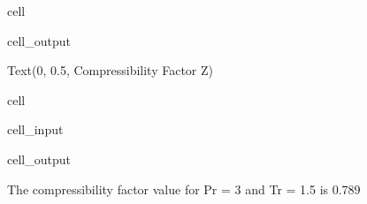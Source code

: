 \documentclass[letterpaper,10pt,english]{jupyterBook}
\begin{document}
\begin{sphinxuseclass}{cell}
\begin{sphinxVerbatimOutput}
\begin{sphinxuseclass}{cell_output}
\begin{sphinxVerbatim}[commandchars=\\\{\}]
Text(0, 0.5, \PYGZsq{}Compressibility Factor Z\PYGZsq{})
\end{sphinxVerbatim}

\noindent{}

\end{sphinxuseclass}\end{sphinxVerbatimOutput}

\end{sphinxuseclass}
\begin{sphinxuseclass}{cell}\begin{sphinxVerbatimInput}

\begin{sphinxuseclass}{cell_input}
\begin{sphinxVerbatim}[commandchars=\\\{\}]
  

  
  
  \PYG{p}{[}\PYG{p}{]}
    
\end{sphinxVerbatim}

\end{sphinxuseclass}\end{sphinxVerbatimInput}
\begin{sphinxVerbatimOutput}

\begin{sphinxuseclass}{cell_output}
\begin{sphinxVerbatim}[commandchars=\\\{\}]
The compressibility factor value for P\PYGZus{}r = 3 and T\PYGZus{}r = 1.5 is 0.789
\end{sphinxVerbatim}

\end{sphinxuseclass}\end{sphinxVerbatimOutput}

\end{sphinxuseclass}
\sphinxstepscope
\end{document}

